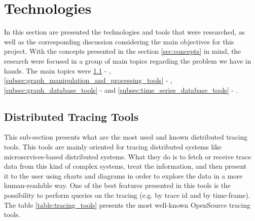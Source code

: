 \section{Technologies}
\label{sec:technologies}

In this section are presented the technologies and tools that were researched, as well as the corresponding discussion considering the main objectives for this project. With the concepts presented in the section \ref{sec:concepts} in mind, the research were focused in a group of main topics regarding the problem we have in hands. The main topics were \ref{subsec:distributed_tracing_tools} - , \ref{subsec:graph_manipulation_and_processing_tools} - , \ref{subsec:graph_database_tools} -  and \ref{subsec:time_series_database_tools} - .

\subsection{Distributed Tracing Tools}
\label{subsec:distributed_tracing_tools}

This sub-section presents what are the most used and known distributed tracing tools. This tools are mainly oriented for tracing distributed systems like microservices-based distributed systems. What they do is to fetch or receive trace data from this kind of complex systems, treat the information, and then present it to the user using charts and diagrams in order to explore the data in a more human-readable way. One of the best features presented in this tools is the possibility to perform queries on the tracing (e.g. by trace id and by time-frame). The table \ref{table:tracing_tools} presents the most well-known OpenSource tracing tools.

